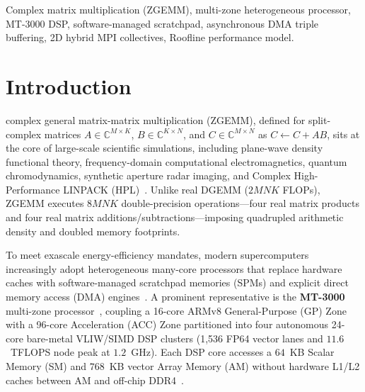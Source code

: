 \documentclass[journal]{IEEEtran}
\begin{document}
\begin{IEEEkeywords}
Complex matrix multiplication (ZGEMM), multi-zone heterogeneous processor, MT-3000 DSP, software-managed scratchpad, asynchronous DMA triple buffering, 2D hybrid MPI collectives, Roofline performance model.
\end{IEEEkeywords}

\section{Introduction}
\label{sec:intro}
 complex general matrix-matrix multiplication (ZGEMM), defined for split-complex matrices $A \in \mathbb{C}^{M \times K}$, $B \in \mathbb{C}^{K \times N}$, and $C \in \mathbb{C}^{M \times N}$ as $C \leftarrow C + AB$, sits at the core of large-scale scientific simulations, including plane-wave density functional theory, frequency-domain computational electromagnetics, quantum chromodynamics, synthetic aperture radar imaging, and Complex High-Performance LINPACK (HPL)~\cite{barrett2010complexhpl, vanzee2017complex}. Unlike real DGEMM ($2MNK$ FLOPs), ZGEMM executes $8MNK$ double-precision operations---four real matrix products and four real matrix additions/subtractions---imposing quadrupled arithmetic density and doubled memory footprints.

To meet exascale energy-efficiency mandates, modern supercomputers increasingly adopt heterogeneous many-core processors that replace hardware caches with software-managed scratchpad memories (SPMs) and explicit direct memory access (DMA) engines~\cite{kahle2005cell, igual2012dsp, fu2016sunway, jiang2017sw26010}. A prominent representative is the \textbf{MT-3000} multi-zone processor~\cite{lu2022mt3000}, coupling a 16-core ARMv8 General-Purpose (GP) Zone with a 96-core Acceleration (ACC) Zone partitioned into four autonomous 24-core bare-metal VLIW/SIMD DSP clusters (1,536 FP64 vector lanes and $11.6$~TFLOPS node peak at $1.2$~GHz). Each DSP core accesses a $64$~KB Scalar Memory (SM) and $768$~KB vector Array Memory (AM) without hardware L1/L2 caches between AM and off-chip DDR4~\cite{fang2026mtgemm, qi2025constraint}.
\end{document}
